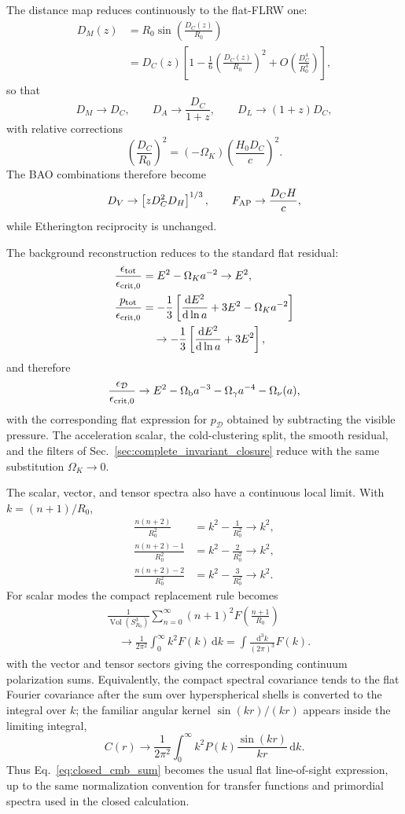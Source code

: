 \documentclass[
  aps,
  prd,
  reprint,
  superscriptaddress,
  nofootinbib,
  floatfix,
  longbibliography
]{revtex4-2}
\theoremstyle{plain}
\theoremstyle{definition}
\theoremstyle{remark}
\newcommand{\dd}{\mathrm d}
\newcommand{\D}{\mathcal D}
\newcommand{\crit}{\epsilon_{\mathrm{crit},0}}
\newcommand{\Vol}{\operatorname{Vol}}
\newcommand{\Ob}{\Omega_{\rm b}}
\newcommand{\Og}{\Omega_\gamma}
\newcommand{\Onu}{\Omega_\nu}
\begin{document}
The distance map reduces continuously to the flat-FLRW one:
\begin{align}
D_M(z)&=R_0\sin\!\left(\frac{D_C(z)}{R_0}\right) \nonumber\\
&=D_C(z)\left[
1-\frac16\left(\frac{D_C(z)}{R_0}\right)^2
+O\!\left(\frac{D_C^4}{R_0^4}\right)\right],
\label{eq:flat_distance_expansion_full}
\end{align}
so that
\[
D_M\to D_C,\qquad
D_A\to\frac{D_C}{1+z},\qquad
D_L\to(1+z)D_C ,
\]
with relative corrections
\[
\left(\frac{D_C}{R_0}\right)^2
=(-\Omega_K)\left(\frac{H_0D_C}{c}\right)^2 .
\]
The BAO combinations therefore become
\[
D_V\to\left[zD_C^2D_H\right]^{1/3},\qquad
F_{\rm AP}\to\frac{D_CH}{c},
\]
while Etherington reciprocity is unchanged.

The background reconstruction reduces to the standard flat residual:
\begin{align}
\frac{\epsilon_{\rm tot}}{\crit}
&=E^2-\Omega_K a^{-2}\to E^2,\\
\frac{p_{\rm tot}}{\crit}
&=-\frac13\left[
\frac{\dd E^2}{\dd\ln a}+3E^2-\Omega_Ka^{-2}\right]
\nonumber\\
&\quad\to
-\frac13\left[
\frac{\dd E^2}{\dd\ln a}+3E^2\right],
\end{align}
and therefore
\[
\frac{\epsilon_{\D}}{\crit}
\to
E^2-\Ob a^{-3}-\Og a^{-4}-\Onu(a),
\]
with the corresponding flat expression for $p_{\D}$ obtained by subtracting
the visible pressure.  The acceleration scalar, the cold-clustering split, the
smooth residual, and the filters of Sec.~\ref{sec:complete_invariant_closure} reduce
with the same substitution $\Omega_K\to0$.

The scalar, vector, and tensor spectra also have a continuous local limit.  With
$k=(n+1)/R_0$,
\begin{align}
\frac{n(n+2)}{R_0^2}
&=k^2-\frac{1}{R_0^2}\to k^2,\\
\frac{n(n+2)-1}{R_0^2}
&=k^2-\frac{2}{R_0^2}\to k^2,\\
\frac{n(n+2)-2}{R_0^2}
&=k^2-\frac{3}{R_0^2}\to k^2 .
\end{align}
For scalar modes the compact replacement rule becomes
\begin{align}
&\frac{1}{\Vol(S^3_{R_0})}
\sum_{n=0}^\infty (n+1)^2
F\!\left(\frac{n+1}{R_0}\right)
\nonumber\\
&\quad\longrightarrow
\frac{1}{2\pi^2}\int_0^\infty k^2F(k)\,\dd k
=
\int\frac{\dd^3k}{(2\pi)^3}F(k).
\label{eq:flat_replacement_limit}
\end{align}
with the vector and tensor sectors giving the corresponding continuum
polarization sums.  Equivalently, the compact spectral covariance tends to the
flat Fourier covariance after the sum over hyperspherical shells is converted
to the integral over $k$; the familiar angular kernel $\sin(kr)/(kr)$ appears
inside the limiting integral,
\[
C(r)\to
\frac{1}{2\pi^2}\int_0^\infty
k^2 P(k)\frac{\sin(kr)}{kr}\,\dd k .
\]
Thus Eq.~\eqref{eq:closed_cmb_sum} becomes the usual flat line-of-sight
expression, up to the same normalization convention for transfer functions and
primordial spectra used in the closed calculation.
\end{document}
